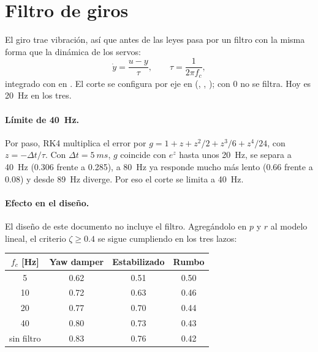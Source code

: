 \documentclass[11pt,a4paper]{article}
\begin{document}
\section{Filtro de giros}
\label{sec:filtro}

El giro trae vibración, así que antes de las leyes pasa por un filtro con la
misma forma que la dinámica de los servos:
\begin{equation}
  \dot y = \frac{u - y}{\tau}, \qquad \tau = \frac{1}{2\pi f_c},
\end{equation}
integrado con  en . El corte se configura
por eje en  (,
, ); con 0 no se
filtra. Hoy es \SI{20}{Hz} en los tres.

\paragraph{Límite de \SI{40}{Hz}.} Por paso, RK4 multiplica el error por
$g = 1 + z + z^2/2 + z^3/6 + z^4/24$, con $z = -\Delta t/\tau$. Con
$\Delta t = \SI{5}{ms}$, $g$ coincide con $e^{z}$ hasta unos \SI{20}{Hz}, se
separa a \SI{40}{Hz} (0.306 frente a 0.285), a \SI{80}{Hz} ya responde mucho
más lento (0.66 frente a 0.08) y desde \SI{89}{Hz} diverge. Por eso el corte se
limita a \SI{40}{Hz}.

\paragraph{Efecto en el diseño.} El diseño de este documento no incluye el
filtro. Agregándolo en $p$ y $r$ al modelo lineal, el criterio
$\zeta \ge 0.4$ se sigue cumpliendo en los tres lazos:

\begin{center}
\begin{tabular}{cccc}
\toprule
$f_c$ [\si{Hz}] & Yaw damper & Estabilizado & Rumbo \\
\midrule
5        & 0.62 & 0.51 & 0.50 \\
10       & 0.72 & 0.63 & 0.46 \\
20       & 0.77 & 0.70 & 0.44 \\
40       & 0.80 & 0.73 & 0.43 \\
sin filtro & 0.83 & 0.76 & 0.42 \\
\bottomrule
\end{tabular}
\end{center}
\end{document}
